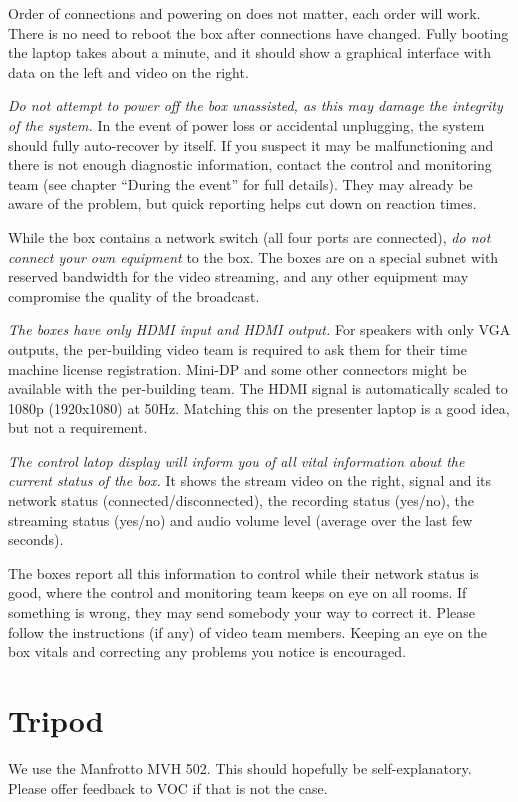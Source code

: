 \documentclass{article}
\begin{document}
Order of connections and powering on does not matter, each order will work. There is no need to reboot the box after connections have changed.
Fully booting the laptop takes about a minute, and it should show a graphical interface with data on the left and video on the right.

\emph{Do not attempt to power off the box unassisted, as this may damage the integrity of the system.}
In the event of power loss or accidental unplugging, the system should fully auto-recover by itself. If you suspect it may be malfunctioning and there is not enough diagnostic information, contact the control and monitoring team (see chapter ``During the event'' for full details). They may already be aware of the problem, but quick reporting helps cut down on reaction times.

While the box contains a network switch (all four ports are connected), \emph{do not connect your own equipment} to the box. The boxes are on a special subnet with reserved bandwidth for the video streaming, and any other equipment may compromise the quality of the broadcast.

\emph{The boxes have only HDMI input and HDMI output.}
For speakers with only VGA outputs, the per-building video team is required to ask them for their time machine license registration. Mini-DP and some other connectors might be available with the per-building team.
The HDMI signal is automatically scaled to 1080p (1920x1080) at 50Hz. Matching this on the presenter laptop is a good idea, but not a requirement.

\emph{The control latop display will inform you of all vital information about the current status of the box.} It shows the stream video on the right, signal and its network status (connected/disconnected), the recording status (yes/no), the streaming status (yes/no) and audio volume level (average over the last few seconds).

The boxes report all this information to control while their network status is good, where the control and monitoring team keeps on eye on all rooms. If something is wrong, they may send somebody your way to correct it. Please follow the instructions (if any) of video team members. Keeping an eye on the box vitals and correcting any problems you notice is encouraged.

\section{Tripod}
We use the Manfrotto MVH 502. This should hopefully be self-explanatory. Please offer feedback to VOC if that is not the case.
\end{document}
